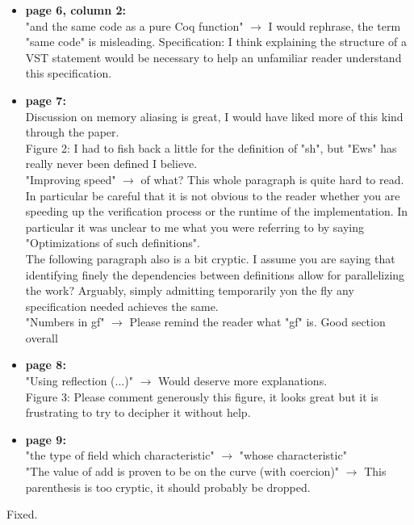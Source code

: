 \begin{itemize}
  \item \textbf{page 6, column 2:}\\
    "and the same code as a pure Coq function" $\rightarrow$ I would rephrase, the term "same code" is misleading.
    Specification: I think explaining the structure of a VST statement would be necessary to help an unfamiliar reader understand this specification.

  \item \textbf{page 7:}\\
    Discussion on memory aliasing is great, I would have liked more of this kind through the paper.\\
    Figure 2: I had to fish back a little for the definition of "sh", but "Ews" has really never been defined I believe.\\
    "Improving speed" $\rightarrow$ of what? This whole paragraph is quite hard to read. In particular be careful that it is not obvious to the reader whether you are speeding up the verification process or the runtime of the implementation. In particular it was unclear to me what you were referring to by saying "Optimizations of such definitions".\\
    The following paragraph also is a bit cryptic. I assume you are saying that identifying finely the dependencies between definitions allow for parallelizing the work? Arguably, simply admitting temporarily yon the fly any specification needed  achieves the same.\\
    "Numbers in gf" $\rightarrow$ Please remind the reader what "gf" is. Good section overall

  \item \textbf{page 8:}\\
    "Using reflection (...)" $\rightarrow$ Would deserve more explanations.\\
    Figure 3: Please comment generously this figure, it looks great but it is frustrating to try to decipher it without help.

  \item \textbf{page 9:}\\
    "the type of field which characteristic" $\rightarrow$ "whose characteristic"\\
    "The value of add is proven to be on the curve (with coercion)" $\rightarrow$ This parenthesis is too cryptic, it should probably be dropped.
\end{itemize}
\begin{answer}
  Fixed.
\end{answer}

